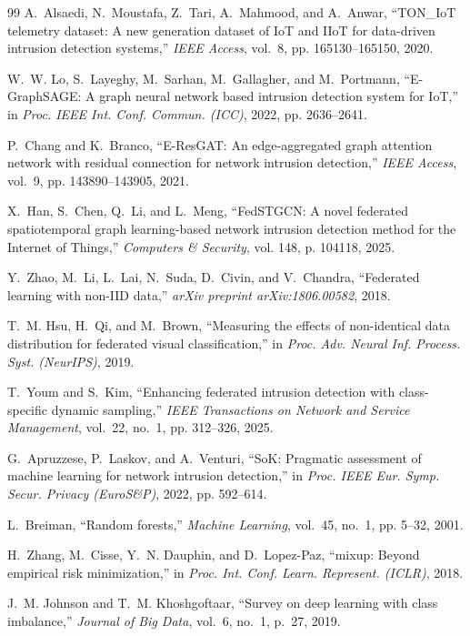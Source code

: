 \documentclass[12pt,a4paper]{report}
\begin{document}
\begin{thebibliography}{99}
A.~Alsaedi, N.~Moustafa, Z.~Tari, A.~Mahmood, and A.~Anwar, ``TON\_IoT telemetry dataset: A new generation dataset of IoT and IIoT for data-driven intrusion detection systems,'' \emph{IEEE Access}, vol.~8, pp. 165130--165150, 2020.

W.~W. Lo, S.~Layeghy, M.~Sarhan, M.~Gallagher, and M.~Portmann, ``E-GraphSAGE: A graph neural network based intrusion detection system for IoT,'' in \emph{Proc. IEEE Int. Conf. Commun. (ICC)}, 2022, pp. 2636--2641.

P.~Chang and K.~Branco, ``E-ResGAT: An edge-aggregated graph attention network with residual connection for network intrusion detection,'' \emph{IEEE Access}, vol.~9, pp. 143890--143905, 2021.

X.~Han, S.~Chen, Q.~Li, and L.~Meng, ``FedSTGCN: A novel federated spatiotemporal graph learning-based network intrusion detection method for the Internet of Things,'' \emph{Computers \& Security}, vol. 148, p. 104118, 2025.

Y.~Zhao, M.~Li, L.~Lai, N.~Suda, D.~Civin, and V.~Chandra, ``Federated learning with non-IID data,'' \emph{arXiv preprint arXiv:1806.00582}, 2018.

T.~M. Hsu, H.~Qi, and M.~Brown, ``Measuring the effects of non-identical data distribution for federated visual classification,'' in \emph{Proc. Adv. Neural Inf. Process. Syst. (NeurIPS)}, 2019.

T.~Youm and S.~Kim, ``Enhancing federated intrusion detection with class-specific dynamic sampling,'' \emph{IEEE Transactions on Network and Service Management}, vol.~22, no.~1, pp. 312--326, 2025.

G.~Apruzzese, P.~Laskov, and A.~Venturi, ``SoK: Pragmatic assessment of machine learning for network intrusion detection,'' in \emph{Proc. IEEE Eur. Symp. Secur. Privacy (EuroS\&P)}, 2022, pp. 592--614.

L.~Breiman, ``Random forests,'' \emph{Machine Learning}, vol.~45, no.~1, pp. 5--32, 2001.

H.~Zhang, M.~Cisse, Y.~N. Dauphin, and D.~Lopez-Paz, ``mixup: Beyond empirical risk minimization,'' in \emph{Proc. Int. Conf. Learn. Represent. (ICLR)}, 2018.

J.~M. Johnson and T.~M. Khoshgoftaar, ``Survey on deep learning with class imbalance,'' \emph{Journal of Big Data}, vol.~6, no.~1, p.~27, 2019.


\end{thebibliography}
\end{document}

